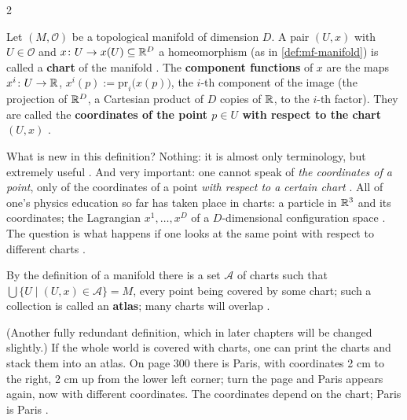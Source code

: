 \begin{paracol}{2}
\begin{definition}\label{def:mf-chart}
Let $(M,\mathcal O)$ be a topological manifold of dimension $D$. A pair $(U,x)$ with $U\in\mathcal O$ and $x\colon U\to x(U)\subseteq\mathbb{R}^D$ a homeomorphism (as in \cref{def:mf-manifold}) is called a \textbf{chart} of the manifold
. The \textbf{component functions} of $x$ are the maps $x^i\colon U\to\mathbb{R}$,
$x^i(p):=\mathrm{pr}_i\bigl(x(p)\bigr)$, the $i$-th component of the image (the projection of $\mathbb{R}^D$, a Cartesian product of $D$ copies of $\mathbb{R}$, to the $i$-th factor). They are called the \textbf{coordinates of the point $p\in U$ with respect to the chart $(U,x)$}
.
\end{definition}
What is new in this definition? Nothing: it is almost only terminology, but extremely useful . And very important: one cannot speak of \emph{the coordinates of a point}, only of the coordinates of a point \emph{with respect to a certain chart} .
All of one's physics education so far has taken place in charts: a particle in $\mathbb{R}^3$ and its coordinates; the Lagrangian $x^1,\dots,x^D$ of a $D$-dimensional configuration space . The question is what happens
if one looks at the same point with respect to different charts .

\begin{definition}\label{def:mf-atlas}
By the definition of a manifold there is a set $\mathcal A$ of charts such that $\bigcup\{U\mid(U,x)\in\mathcal A\}=M$, every point being covered by some chart; such a collection is called an \textbf{atlas}; many charts will overlap
.
\end{definition}
(Another fully redundant definition, which in later chapters will be changed slightly.) If the whole world is covered with charts, one can print the charts and stack them into an atlas. On page 300 there is Paris, with coordinates 2 cm to the right, 2 cm up from the lower left corner; turn the page and Paris appears again, now with
different coordinates. The coordinates depend on the chart; Paris is Paris .


\end{paracol}

